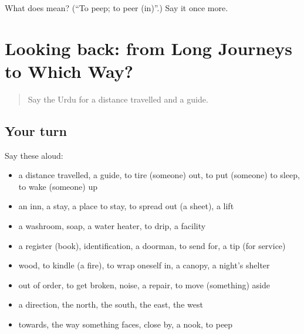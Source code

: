 \begin{tcolorbox}[breakable,colback=teal!4,colframe=teal!35!black,title={Before you move on}]
What does  mean? (\textquotedblleft{}To peep; to peer (in)\textquotedblright{}.) Say it once more.
\end{tcolorbox}
\section[(dialogue)]{Looking back: from Long Journeys to Which Way?}

\label{lesson:UR-R409-review-402-409}



\begin{quote}
Say the Urdu for a distance travelled and a guide.
\end{quote}

\subsection*{Your turn}
Say these aloud:

\begin{itemize}
\raggedright
  \item a distance travelled, a guide, to tire (someone) out, to put (someone) to sleep, to wake (someone) up
  \item an inn, a stay, a place to stay, to spread out (a sheet), a lift
  \item a washroom, soap, a water heater, to drip, a facility
  \item a register (book), identification, a doorman, to send for, a tip (for service)
  \item wood, to kindle (a fire), to wrap oneself in, a canopy, a night's shelter
  \item out of order, to get broken, noise, a repair, to move (something) aside
  \item a direction, the north, the south, the east, the west
  \item towards, the way something faces, close by, a nook, to peep
\end{itemize}

